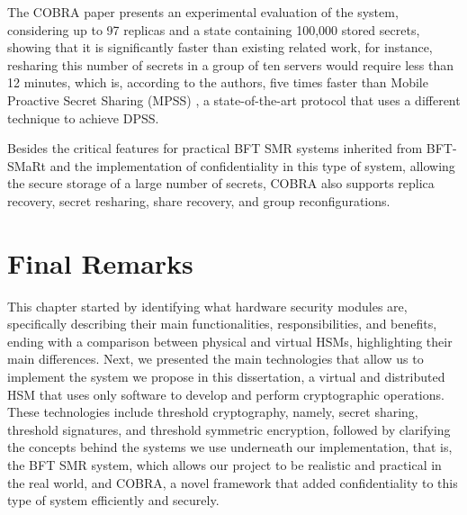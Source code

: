 The COBRA paper presents an experimental evaluation of the system, considering up to 97 replicas and a state containing 100,000 stored secrets, showing that it is significantly faster than existing related work, for instance, resharing this number of secrets in a group of ten servers would require less than 12 minutes, which is, according to the authors, five times faster than Mobile Proactive Secret Sharing (MPSS) \cite{mpss}, a state-of-the-art protocol that uses a different technique to achieve DPSS.

Besides the critical features for practical BFT SMR systems inherited from BFT-SMaRt and the implementation of confidentiality in this type of system, allowing the secure storage of a large number of secrets, COBRA also supports replica recovery, secret resharing, share recovery, and group reconfigurations.

\section{Final Remarks} \label{sec:background-final-remarks}

This chapter started by identifying what hardware security modules are, specifically describing their main functionalities, responsibilities, and benefits, ending with a comparison between physical and virtual HSMs, highlighting their main differences. Next, we presented the main technologies that allow us to implement the system we propose in this dissertation, a virtual and distributed HSM that uses only software to develop and perform cryptographic operations. These technologies include threshold cryptography, namely, secret sharing, threshold signatures, and threshold symmetric encryption, followed by clarifying the concepts behind the systems we use underneath our implementation, that is, the BFT SMR system, which allows our project to be realistic and practical in the real world, and COBRA, a novel framework that added confidentiality to this type of system efficiently and securely.

\LIMPA